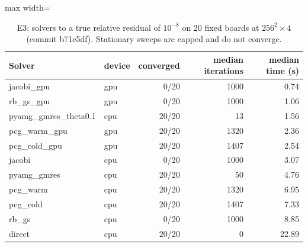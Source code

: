 \begin{table}[t]\centering\small
\begin{adjustbox}{max width=\linewidth}\begin{tabular}{llrrr}
\hline
Solver & device & converged & median iterations & median time (s) \\
\hline
jacobi\_gpu & gpu & 0/20 & 1000 & 0.74 \\
rb\_gs\_gpu & gpu & 0/20 & 1000 & 1.06 \\
pyamg\_gmres\_theta0.1 & cpu & 20/20 & 13 & 1.56 \\
pcg\_warm\_gpu & gpu & 20/20 & 1320 & 2.36 \\
pcg\_cold\_gpu & gpu & 20/20 & 1407 & 2.54 \\
jacobi & cpu & 0/20 & 1000 & 3.07 \\
pyamg\_gmres & cpu & 20/20 & 50 & 4.76 \\
pcg\_warm & cpu & 20/20 & 1320 & 6.95 \\
pcg\_cold & cpu & 20/20 & 1407 & 7.33 \\
rb\_gs & cpu & 0/20 & 1000 & 8.85 \\
direct & cpu & 20/20 & 0 & 22.89 \\
\hline
\end{tabular}\end{adjustbox}
\caption{E3: solvers to a true relative residual of $10^{-8}$ on 20 fixed boards at $256^2\times4$ (commit b71e5df). Stationary sweeps are capped and do not converge.}
\label{tab:solvers}
\end{table}
